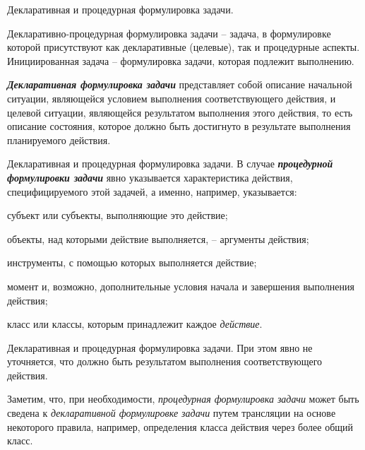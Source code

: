 \begin{frame}{Декларативная и процедурная формулировка задачи.}
	\topline
	\justifying
 
    Декларативно-процедурная формулировка задачи -- задача, в формулировке которой присутствуют как декларативные (целевые), так и процедурные аспекты.  Инициированная задача -- формулировка задачи, которая подлежит выполнению.\\
    \vspace{0.33cm}
    
    \textbf{\textit{Декларативная формулировка задачи}} представляет собой описание начальной ситуации, являющейся условием выполнения соответствующего действия, и целевой ситуации, являющейся результатом выполнения этого действия, то есть  описание состояния, которое должно быть достигнуто в результате выполнения планируемого действия. 
\end{frame}

\begin{frame}{Декларативная и процедурная формулировка задачи.}
	\topline
	\justifying
     В случае \textbf{\textit{процедурной формулировки задачи}} явно указывается характеристика действия, специфицируемого этой задачей, а именно, например, указывается:
    \begin{textitemize}
    \item субъект или субъекты, выполняющие это действие;
    \item объекты, над которыми действие выполняется, -- аргументы действия;
    \item инструменты, с помощью которых выполняется действие;
    \item момент и, возможно, дополнительные условия начала и завершения выполнения действия;
    \item класс или классы, которым принадлежит каждое \textit{действие}.
    \end{textitemize}	
\end{frame}

\begin{frame}{Декларативная и процедурная формулировка задачи.}
	\topline
	\justifying
    При этом явно не уточняется, что должно быть результатом выполнения соответствующего действия. 
        
    \vspace{0.33cm}
    
    Заметим, что, при необходимости, \textit{процедурная формулировка задачи} может быть сведена к \textit{декларативной формулировке задачи} путем трансляции на основе некоторого правила, например, определения класса действия через более общий класс.
\end{frame}

